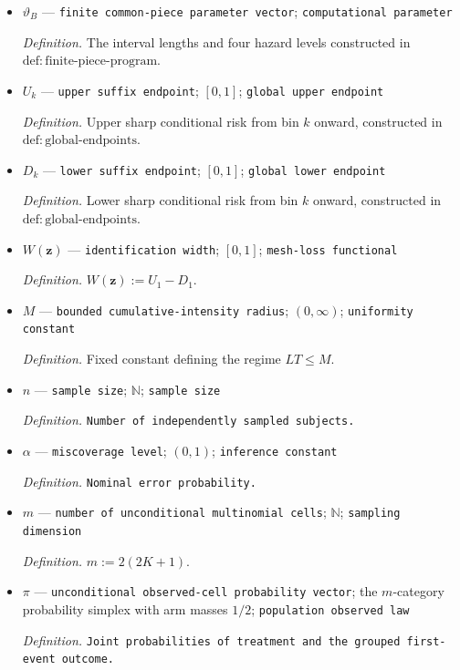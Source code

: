\documentclass{article}
\begin{document}
\begin{itemize}
  \item \(\vartheta_B\) --- \texttt{finite common-\allowbreak{}piece parameter vector}; \texttt{computational parameter}
  \par\smallskip\noindent\emph{Definition.} The interval lengths and four hazard levels constructed in \(\mathrm{def{:}finite\text{-}piece\text{-}program}\).
  \item \(U_k\) --- \texttt{upper suffix endpoint}; \([0,1]\); \texttt{global upper endpoint}
  \par\smallskip\noindent\emph{Definition.} Upper sharp conditional risk from bin \(k\) onward, constructed in \(\mathrm{def{:}global\text{-}endpoints}\).
  \item \(D_k\) --- \texttt{lower suffix endpoint}; \([0,1]\); \texttt{global lower endpoint}
  \par\smallskip\noindent\emph{Definition.} Lower sharp conditional risk from bin \(k\) onward, constructed in \(\mathrm{def{:}global\text{-}endpoints}\).
  \item \(W(\mathbf z)\) --- \texttt{identification width}; \([0,1]\); \texttt{mesh-\allowbreak{}loss functional}
  \par\smallskip\noindent\emph{Definition.} \(W(\mathbf z):=U_1-D_1\).
  \item \(M\) --- \texttt{bounded cumulative-\allowbreak{}intensity radius}; \((0,\infty)\); \texttt{uniformity constant}
  \par\smallskip\noindent\emph{Definition.} Fixed constant defining the regime \(LT\le M\).
  \item \(n\) --- \texttt{sample size}; \(\mathbb N\); \texttt{sample size}
  \par\smallskip\noindent\emph{Definition.} \texttt{Number of independently sampled subjects.}
  \item \(\alpha\) --- \texttt{miscoverage level}; \((0,1)\); \texttt{inference constant}
  \par\smallskip\noindent\emph{Definition.} \texttt{Nominal error probability.}
  \item \(m\) --- \texttt{number of unconditional multinomial cells}; \(\mathbb N\); \texttt{sampling dimension}
  \par\smallskip\noindent\emph{Definition.} \(m:=2(2K+1)\).
  \item \(\pi\) --- \texttt{unconditional observed-\allowbreak{}cell probability vector}; the \(m\)-category probability simplex with arm masses \(1/2\); \texttt{population observed law}
  \par\smallskip\noindent\emph{Definition.} \texttt{Joint probabilities of treatment and the grouped first-\allowbreak{}event outcome.}

\end{itemize}
\end{document}
